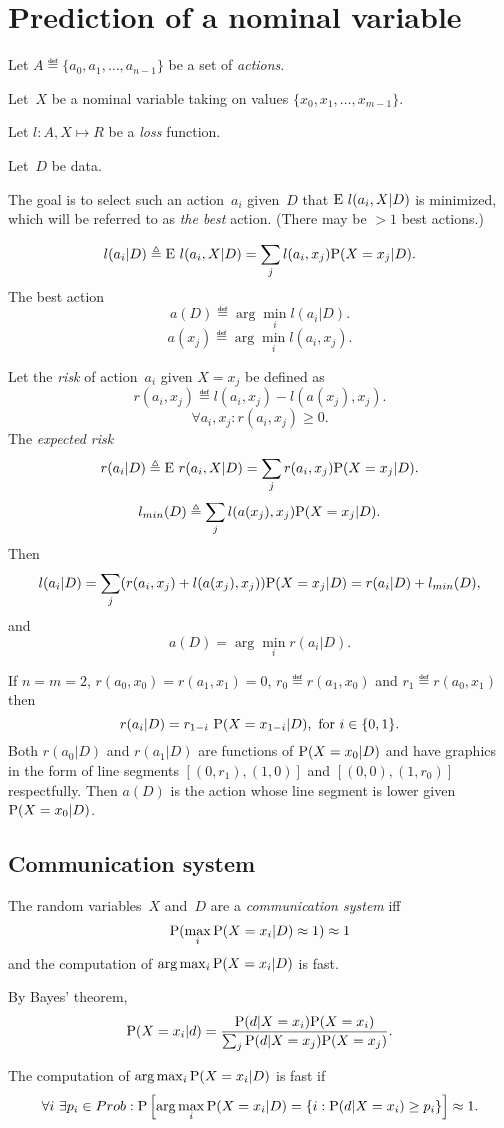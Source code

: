 \documentclass[10pt,a4paper]{article}
\theoremstyle{plain} \newtheorem{Lem}{Lemma}
\begin{document}
\section {Prediction of a nominal variable}
Let $A \eqdef \{a_0, a_1, \dots, a_{n-1}\}$ be a set of {\em actions}.

Let~$X$ be a nominal variable taking on values $\{x_0, x_1, \dots, x_{m-1}\}$.

Let $l: A, X \mapsto R$ be a {\em loss} function.

Let~$D$ be data.

The goal is to select such an action~$a_i$ given~$D$ that $\E l(a_i, X|D)$ is minimized, 
which will be referred to as {\em the best} action.
(There may be $>1$ best actions.)

$$ l(a_i|D) \eqdef \E l(a_i, X|D) = \sum_j l(a_i,x_j) \P (X=x_j|D). $$
The best action 
$$ a(D) \eqdef \arg\min_i l(a_i|D). $$
$$ a(x_j) \eqdef \arg \min_i l(a_i,x_j). $$

Let the {\em risk} of action~$a_i$ given $X=x_j$ be defined as
$$ r(a_i,x_j) \eqdef l(a_i,x_j) - l(a(x_j),x_j). $$
$$ \forall a_i, x_j : r(a_i,x_j) \ge 0. $$
The {\em expected risk} 
$$ r(a_i|D) \eqdef  \E r(a_i, X|D) = \sum_j r(a_i,x_j) \P (X=x_j|D). $$
$$ l_{min}(D) \eqdef \sum_j l(a(x_j),x_j) \P (X=x_j|D). $$
Then
$$ l(a_i|D) = \sum_j (r(a_i,x_j) + l(a(x_j),x_j)) \P (X=x_j|D) = r(a_i|D) + l_{min}(D), $$
and
$$ a(D) = \arg \min_i r(a_i|D). $$

If $n = m = 2$, $r(a_0,x_0) = r(a_1,x_1) = 0$, $r_0 \eqdef r(a_1,x_0)$ and $r_1 \eqdef r(a_0,x_1)$ then
$$ r(a_i|D) = r_{1-i} \ \P (X = x_{1-i}|D), \text{ for } i \in \{0,1\}. $$
Both $r(a_0|D)$ and $r(a_1|D)$ are functions of $\P(X=x_0|D)$ 
and have graphics in the form of line segments $[(0,r_1),(1,0)]$ and $[(0,0),(1,r_0)]$ respectfully.
Then $a(D)$ is the action whose line segment is lower given $\P(X=x_0|D)$.


\subsection {Communication system}
The random variables~$X$ and~$D$ are a {\em communication system} iff 
$$ \P(\max_i \P(X=x_i|D) \approx 1) \approx 1 $$
and the computation of $\arg \max_i \P(X=x_i|D)$ is fast.

By Bayes' theorem,
$$ \P(X=x_i|d) = \frac {\P(d|X=x_i) \P(X=x_i)} {\sum_j \P(d|X=x_j) \P(X=x_j)}. $$

The computation of $\arg \max_i \P(X=x_i|D)$ is fast if
$$ \forall i \ \exists p_i \in Prob : \P\left[\arg \max_i \P(X=x_i|D) = \{i: \P(d|X=x_i) \ge p_i\} \right] \approx 1. $$
\end{document}
